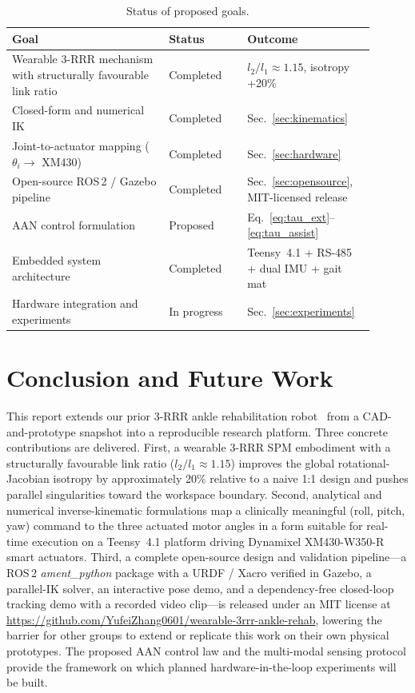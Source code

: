 \documentclass[conference]{IEEEtran}
\begin{document}
\begin{table}[!t]
\centering
\caption{Status of proposed goals.}
\label{tab:goals}
\begin{tabular}{p{0.40\linewidth} p{0.20\linewidth} p{0.30\linewidth}}
\toprule
\textbf{Goal} & \textbf{Status} & \textbf{Outcome}\\
\midrule
Wearable 3-RRR mechanism with structurally favourable link ratio & Completed & $l_2/l_1\approx 1.15$, isotropy +20\%\\
Closed-form and numerical IK & Completed & Sec.~\ref{sec:kinematics}\\
Joint-to-actuator mapping ($\theta_i \to$ XM430) & Completed & Sec.~\ref{sec:hardware}\\
Open-source ROS\,2 / Gazebo pipeline & Completed & Sec.~\ref{sec:opensource}, MIT-licensed release\\
AAN control formulation & Proposed & Eq.~\eqref{eq:tau_ext}--\eqref{eq:tau_assist}\\
Embedded system architecture & Completed & Teensy~4.1 + RS-485 + dual IMU + gait mat\\
Hardware integration and experiments & In progress & Sec.~\ref{sec:experiments}\\
\bottomrule
\end{tabular}
\end{table}

\section{Conclusion and Future Work}
\label{sec:conclusion}

This report extends our prior 3-RRR ankle rehabilitation robot~\cite{zhang2025rehab} from a CAD-and-prototype snapshot into a reproducible research platform. Three concrete contributions are delivered. First, a wearable 3-RRR SPM embodiment with a structurally favourable link ratio ($l_2/l_1\approx 1.15$) improves the global rotational-Jacobian isotropy by approximately 20\% relative to a naive 1:1 design and pushes parallel singularities toward the workspace boundary. Second, analytical and numerical inverse-kinematic formulations map a clinically meaningful (roll, pitch, yaw) command to the three actuated motor angles in a form suitable for real-time execution on a Teensy~4.1 platform driving Dynamixel XM430-W350-R smart actuators. Third, a complete open-source design and validation pipeline---a ROS\,2 \emph{ament\_python} package with a URDF / Xacro verified in Gazebo, a parallel-IK solver, an interactive pose demo, and a dependency-free closed-loop tracking demo with a recorded video clip---is released under an MIT license at \url{https://github.com/YufeiZhang0601/wearable-3rrr-ankle-rehab}, lowering the barrier for other groups to extend or replicate this work on their own physical prototypes. The proposed AAN control law and the multi-modal sensing protocol provide the framework on which planned hardware-in-the-loop experiments will be built.
\end{document}
